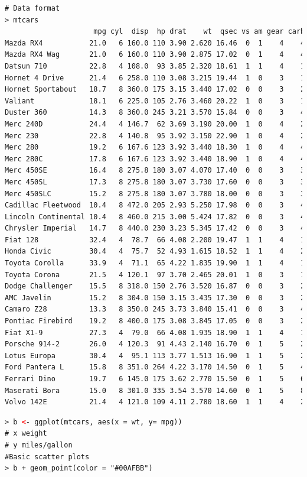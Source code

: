 \begin{lstlisting}[language=html]
# Data format
> mtcars
                     mpg cyl  disp  hp drat    wt  qsec vs am gear carb
Mazda RX4           21.0   6 160.0 110 3.90 2.620 16.46  0  1    4    4
Mazda RX4 Wag       21.0   6 160.0 110 3.90 2.875 17.02  0  1    4    4
Datsun 710          22.8   4 108.0  93 3.85 2.320 18.61  1  1    4    1
Hornet 4 Drive      21.4   6 258.0 110 3.08 3.215 19.44  1  0    3    1
Hornet Sportabout   18.7   8 360.0 175 3.15 3.440 17.02  0  0    3    2
Valiant             18.1   6 225.0 105 2.76 3.460 20.22  1  0    3    1
Duster 360          14.3   8 360.0 245 3.21 3.570 15.84  0  0    3    4
Merc 240D           24.4   4 146.7  62 3.69 3.190 20.00  1  0    4    2
Merc 230            22.8   4 140.8  95 3.92 3.150 22.90  1  0    4    2
Merc 280            19.2   6 167.6 123 3.92 3.440 18.30  1  0    4    4
Merc 280C           17.8   6 167.6 123 3.92 3.440 18.90  1  0    4    4
Merc 450SE          16.4   8 275.8 180 3.07 4.070 17.40  0  0    3    3
Merc 450SL          17.3   8 275.8 180 3.07 3.730 17.60  0  0    3    3
Merc 450SLC         15.2   8 275.8 180 3.07 3.780 18.00  0  0    3    3
Cadillac Fleetwood  10.4   8 472.0 205 2.93 5.250 17.98  0  0    3    4
Lincoln Continental 10.4   8 460.0 215 3.00 5.424 17.82  0  0    3    4
Chrysler Imperial   14.7   8 440.0 230 3.23 5.345 17.42  0  0    3    4
Fiat 128            32.4   4  78.7  66 4.08 2.200 19.47  1  1    4    1
Honda Civic         30.4   4  75.7  52 4.93 1.615 18.52  1  1    4    2
Toyota Corolla      33.9   4  71.1  65 4.22 1.835 19.90  1  1    4    1
Toyota Corona       21.5   4 120.1  97 3.70 2.465 20.01  1  0    3    1
Dodge Challenger    15.5   8 318.0 150 2.76 3.520 16.87  0  0    3    2
AMC Javelin         15.2   8 304.0 150 3.15 3.435 17.30  0  0    3    2
Camaro Z28          13.3   8 350.0 245 3.73 3.840 15.41  0  0    3    4
Pontiac Firebird    19.2   8 400.0 175 3.08 3.845 17.05  0  0    3    2
Fiat X1-9           27.3   4  79.0  66 4.08 1.935 18.90  1  1    4    1
Porsche 914-2       26.0   4 120.3  91 4.43 2.140 16.70  0  1    5    2
Lotus Europa        30.4   4  95.1 113 3.77 1.513 16.90  1  1    5    2
Ford Pantera L      15.8   8 351.0 264 4.22 3.170 14.50  0  1    5    4
Ferrari Dino        19.7   6 145.0 175 3.62 2.770 15.50  0  1    5    6
Maserati Bora       15.0   8 301.0 335 3.54 3.570 14.60  0  1    5    8
Volvo 142E          21.4   4 121.0 109 4.11 2.780 18.60  1  1    4    2
\end{lstlisting}
\begin{lstlisting}[language=html]
> b <- ggplot(mtcars, aes(x = wt, y= mpg))
# x weight
# y miles/gallon
#Basic scatter plots
> b + geom_point(color = "#00AFBB")
\end{lstlisting}

